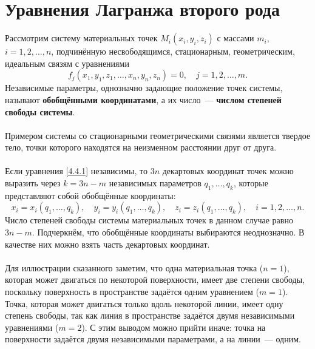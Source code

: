 \documentclass[a4paper, 12pt]{report}
\numberwithin{equation}{section}
\begin{document}
	\section{Уравнения Лагранжа второго рода}
	Рассмотрим систему материальных точек $M_i(x_i, y_i, z_i)$ с массами $m_i$, $i = 1, 2, \dots, n$, подчинённую несвободящимся, стационарным, геометрическим, идеальным связям с уравнениями
	\begin{equation}
		\label{4.4.1}
		f_j(x_1, y_1, z_1, \dots, x_n, y_n, z_n) = 0, \quad j = 1, 2, \dots, m.
	\end{equation}
	Независимые параметры, однозначно задающие положение точек системы, называют \textbf{обобщёнными координатами}, а их число~--- \textbf{числом степеней свободы системы}.
	\\\\
	Примером системы со стационарными геометрическими связями
	является твердое тело, точки которого находятся на неизменном расстоянии друг от друга.
	\\\\
	Если уравнения \eqref{4.4.1} независимы, то $3n$ декартовых координат точек можно выразить через $k = 3n - m$ независимых параметров $q_1, \dots, q_k$, которые представляют собой обобщённые координаты:
	\begin{equation}
		\label{4.15}
		x_i = x_i(q_1, \dots, q_k), \quad
		y_i = y_i(q_1, \dots, q_k), \quad
		z_i = z_i(q_1, \dots, q_k), \quad
		i = 1, 2, \dots, n.
	\end{equation}
	Число степеней свободы системы материальных точек в данном случае равно $3n - m$. Подчеркнём, что обобщённые координаты выбираются неоднозначно. В качестве них можно взять часть декартовых координат.
	\\\\
	Для иллюстрации сказанного заметим, что одна материальная точка ($n = 1$), которая может двигаться по некоторой поверхности, имеет две степени свободы, поскольку поверхность в пространстве задаётся одним уравнением ($m = 1$). Точка, которая может двигаться только вдоль некоторой линии, имеет одну степень свободы, так как линия в пространстве задаётся двумя независимыми уравнениями ($m = 2$). С этим выводом можно прийти иначе: точка на поверхности задаётся двумя независимыми параметрами, а на линии~--- одним.
	
\end{document}
